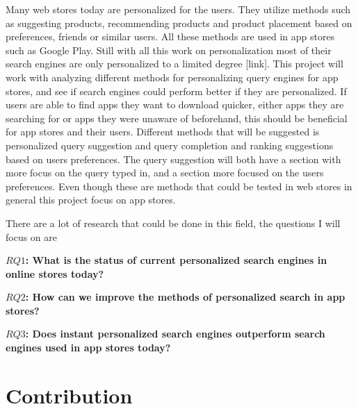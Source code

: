   Many web stores today are personalized for the users. They utilize methods such as suggesting products, recommending products and product placement based on preferences, friends or similar users. All these methods are used in app stores such as Google Play. Still with all this work on personalization most of their search engines are only personalized to a limited degree [link]. This project will work with analyzing different methods for personalizing query engines for app stores, and see if search engines could perform better if they are personalized. If users are able to find apps they want to download quicker, either apps they are searching for or apps they were unaware of beforehand, this should be beneficial for app stores and their users. Different methods that will be suggested is personalized query suggestion and query completion and ranking suggestions based on users preferences. The query suggestion will both have a section with more focus on the query typed in, and a section more focused on the users preferences. Even though these are methods that could be tested in web stores in general this project focus on app stores.

  There are a lot of research that could be done in this field, the questions I will focus on are
  \newline

  {\bf $RQ1$: What is the status of current personalized search engines in online stores today?}

  {\bf $RQ2$: How can we improve the methods of personalized search in app stores?}

  {\bf $RQ3$: Does instant personalized search engines outperform search engines used in app stores today?}

  
  \section*{Contribution} %

